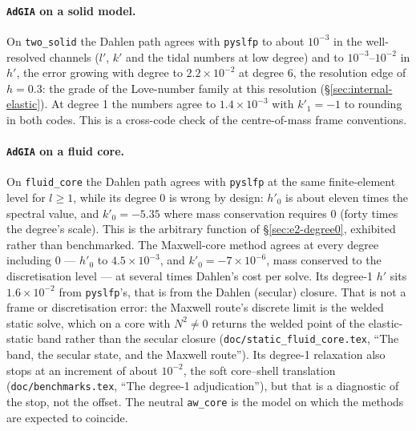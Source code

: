 \documentclass[11pt]{article}
\numberwithin{equation}{section}
\newcommand{\code}[1]{\texttt{#1}}
\begin{document}
\paragraph{\code{AdGIA} on a solid model.} On \code{two\_solid} the Dahlen
path agrees with \code{pyslfp} to about $10^{-3}$ in the well-resolved
channels ($l'$, $k'$ and the tidal numbers at low degree) and to
$10^{-3}$--$10^{-2}$ in $h'$, the error growing with degree to
$2.2\times10^{-2}$ at degree 6, the resolution edge of $h=0.3$: the grade of
the Love-number family at this resolution (\S\ref{sec:internal-elastic}). At degree 1 the numbers agree to
$1.4\times10^{-3}$ with $k'_1=-1$ to rounding in both codes. This is a
cross-code check of the centre-of-mass frame conventions.

\paragraph{\code{AdGIA} on a fluid core.} On \code{fluid\_core} the Dahlen
path agrees with \code{pyslfp} at the same finite-element level for
$l\ge1$, while its degree 0 is wrong by design: $h'_0$ is about eleven times
the spectral value, and $k'_0=-5.35$ where mass conservation requires 0
(forty times the degree's scale). This is the arbitrary function of
\S\ref{sec:e2-degree0}, exhibited rather than benchmarked. The Maxwell-core
method agrees at every degree including 0 --- $h'_0$ to $4.5\times10^{-3}$,
and $k'_0=-7\times10^{-6}$, mass conserved to the discretisation level ---
at several times Dahlen's cost per solve. Its degree-1 $h'$ sits
$1.6\times10^{-2}$ from \code{pyslfp}'s, that is from the Dahlen (secular)
closure. That is not a frame or discretisation error: the Maxwell route's
discrete limit is the welded static solve, which on a core with
$N^2\neq0$ returns the welded point of the elastic-static band rather than
the secular closure (\code{doc/static\_fluid\_core.tex}, ``The band, the
secular state, and the Maxwell route''). Its degree-1 relaxation also stops
at an increment of about $10^{-2}$, the soft core--shell translation
(\code{doc/benchmarks.tex}, ``The degree-1 adjudication''), but that is a
diagnostic of the stop, not the offset. The neutral \code{aw\_core} is the
model on which the methods are expected to coincide.
\end{document}
